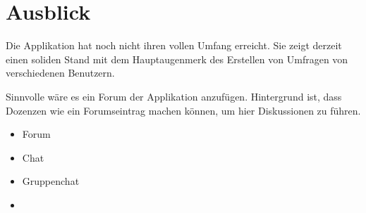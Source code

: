 \section{Ausblick}
\label{sec:Ausblick}

Die Applikation hat noch nicht ihren vollen Umfang erreicht. 
Sie zeigt derzeit einen soliden Stand mit dem Hauptaugenmerk des Erstellen von Umfragen von verschiedenen Benutzern. 

Sinnvolle wäre es ein Forum der Applikation anzufügen. 
Hintergrund ist, dass \zb Dozenzen wie \duzi ein Forumseintrag machen können, um hier Diskussionen zu führen. 


\begin{itemize}
    \item Forum
    \item Chat
    \item Gruppenchat
    \item 
\end{itemize}